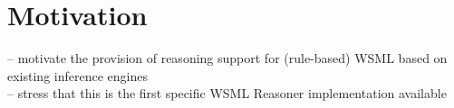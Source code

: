 \section{Motivation\label{sec:motivation}}
-- motivate the provision of reasoning support for (rule-based) WSML based on existing inference engines \\
-- stress that this is the first specific WSML Reasoner implementation available \\
